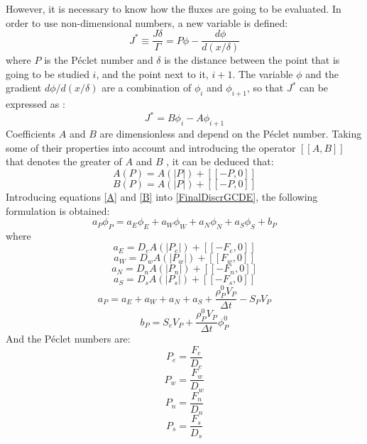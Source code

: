However, it is necessary to know how the fluxes are going to be evaluated. In order to use non-dimensional numbers, a new variable is defined:
\begin{equation}
J^{*}\equiv\frac{J\delta}{\Gamma}=P\phi-\frac{d\phi}{d\left(x/\delta\right)}
\end{equation}
where $P$ is the Péclet number and $\delta$ is the distance between the point that is going to be studied $i$, and the point next to it, $i+1$. The variable $\phi$ and the gradient $d\phi/d\left(x/\delta\right)$ are a combination of $\phi_{i}$ and $\phi_{i+1}$, so that $J^{*}$ can be expressed as \cite{Patankar1980}:
\begin{equation}
J^{*}=B\phi_{i}-A\phi_{i+1}
\end{equation}
Coefficients $A$ and $B$ are dimensionless and depend on the Péclet number. Taking some of their properties into account and introducing the operator $[\![A,B]\!]$ that denotes the greater of $A$ and $B$ \cite{Patankar1980}, it can be deduced that:
\begin{equation}
A\left(P\right)=A\left(|P|\right)+[\![-P,0]\!]
\label{A}
\end{equation}
\begin{equation}
B\left(P\right)=A\left(|P|\right)+[\![-P,0]\!]
\label{B}
\end{equation}
Introducing equations \ref{A} and \ref{B} into \ref{FinalDiscrGCDE}, the following formulation is obtained:
\begin{equation}
a_{P}\phi_{P}=a_{E}\phi_{E}+a_{W}\phi_{W}+a_{N}\phi_{N}+a_{S}\phi_{S}+b_{P}
\label{DiscretizedEquGCDE}
\end{equation}
\label{FinalDiscretizationGCDE}
where
\begin{equation}
a_{E}=D_{e}A\left(|P_{e}|\right)+[\![-F_{e},0]\!]
\end{equation}
\begin{equation}
a_{W}=D_{w}A\left(|P_{w}|\right)+[\![ F_{w},0]\!]
\end{equation}
\begin{equation}
a_{N}=D_{n}A\left(|P_{n}|\right)+[\![-F_{n},0]\!]
\end{equation}
\begin{equation}
a_{S}=D_{s}A\left(|P_{s}|\right)+[\![-F_{s},0]\!]
\end{equation}
\begin{equation}
a_{P}=a_{E}+a_{W}+a_{N}+a_{S}+\frac{\rho_{P}^{0}V_{P}}{\Delta t}-S_{P}V_{P}
\end{equation}
\begin{equation}
b_{P}=S_{c}V_{P}+\frac{\rho_{P}^{0}V_{P}}{\Delta t}\phi_{P}^{0}
\end{equation}
And the Péclet numbers are:
\begin{equation}
P_{e}=\frac{F_{e}}{D_{e}}
\end{equation}
\begin{equation}
P_{w}=\frac{F_{w}}{D_{w}}
\end{equation}
\begin{equation}
P_{n}=\frac{F_{n}}{D_{n}}
\end{equation}
\begin{equation}
P_{s}=\frac{F_{s}}{D_{s}}
\end{equation}

